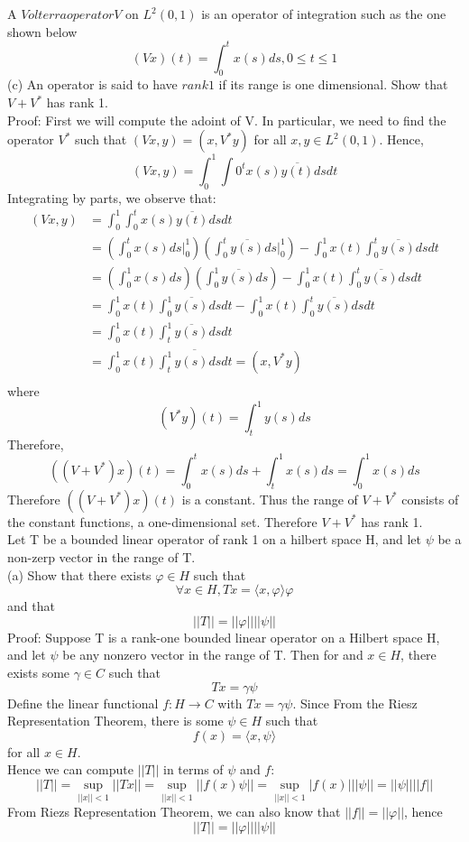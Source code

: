 \documentclass [12pt,letterpaper]{exam}
\begin{document}
\begin{questions}
\question A $Volterra operator V$ on $L^2(0,1)$ is an operator of integration such as the one shown below 
$$(Vx)(t) = \int_{0}^{t} x(s)ds, 0\leq t\leq 1$$
(c) An operator is said to have $rank 1$ if its range is one dimensional. Show that $V + V^*$ has rank 1.\\

Proof: First we will compute the adoint of V. In particular, we need to find the operator $V^*$ such that $(Vx,y) = (x,V^{*}y)$ for all $x,y\in L^{2}(0,1)$. Hence,$$(Vx,y) = \int_{0}^{1}\int{0}^{t} x(s)\overline{y(t)}dsdt$$
Integrating by parts, we observe that:\\
\begin{equation}
\begin{split}
    (Vx,y) &= \int_{0}^{1} \int_{0}^{t} x(s)\overline{y(t)}dsdt\\
    &= (\int_{0}^{t}x(s)ds|_{0}^{1})(\int_{0}^{t}\overline{y(s)}ds|_{0}^{1}) - \int_{0}^{1}x(t)\int_{0}^{t}\overline{y(s)}dsdt\\
&= (\int_{0}^{1}x(s)ds)(\int_{0}^{1}\overline{y(s)}ds) - \int_{0}^{1}x(t)\int_{0}^{t}\overline{y(s)}dsdt\\
&= \int_{0}^{1}x(t)\int_{0}^{1}\overline{y(s)}dsdt - \int_{0}^{1}x(t)\int_{0}^{t}\overline{y(s)}dsdt\\
&= \int_{0}^{1}x(t)\int_{t}^{1}\overline{y(s)}dsdt \\
&= \int_{0}^{1}x(t)\overline{\int_{t}^{1}y(s)dsdt} = (x,V^*y)\\
\end{split}
\end{equation}
where $$(V^*y)(t) = \int_{t}^{1}y(s)ds$$
Therefore, $$((V+V^*)x)(t) = \int_{0}^{t}x(s)ds + \int_{t}^{1}x(s)ds = \int_{0}^{1}x(s)ds$$
Therefore $((V+V^*)x)(t)$ is a constant. Thus the range of $V+V^*$ consists of the constant functions, a one-dimensional set. Therefore $V+V^*$ has rank 1.\\
\question Let T be a bounded linear operator of rank 1 on a hilbert space H, and let $\psi$ be a non-zerp vector in the range of T.\\
(a) Show that there exists $\varphi \in H$ such that
$$\forall x \in H,  Tx = \langle x,\varphi \rangle \varphi$$
and that $$||T|| = ||\varphi||||\psi||$$
Proof: Suppose T is a rank-one bounded linear operator on a Hilbert space H, and let $\psi$ be any nonzero vector in the range of T. Then for and $x \in H$, there exists some $\gamma \in C$ such that $$Tx = \gamma\psi$$
Define the linear functional $f: H \rightarrow C$ with $Tx = \gamma\psi$. Since From the Riesz Representation Theorem, there is some $\psi \in H$ such that $$f(x) = \langle x, \psi \rangle$$ for all $x \in H$.\\
Hence we can compute $||T||$ in terms of $\psi$ and $f$:\\
$$||T|| = \sup_{||x||<1}||Tx|| = \sup_{||x||<1}||f(x)\psi|| = \sup_{||x||<1}|f(x)|||\psi|| = ||\psi||||f||$$
From Riezs Representation Theorem, we can also know that $||f|| = ||\varphi||$, hence
$$||T|| = ||\varphi||||\psi||$$


\end{questions}
\end{document}
